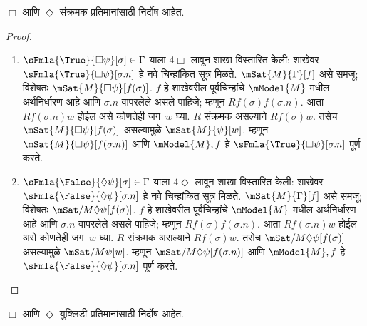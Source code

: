 \begin{prop}
  \label{nml:tab:msn:prop:soundness-4}
  $\Box$
   आणि
  $\Diamond$
  संक्रमक प्रतिमानांसाठी
  निर्दोष आहेत.
\end{prop}
\begin{proof}
\begin{enumerate}
\item $\sFmla{\True}{\Box \psi}[\sigma] \in \Gamma$
  याला 4$\Box$ लावून शाखा विस्तारित केली:
  शाखेवर
    $\sFmla{\True}{\Box\psi}[\sigma.n]$ हे नवे
    चिन्हांकित सूत्र मिळते. $\mSat{M}{\Gamma}[f]$
    असे समजू; विशेषतः
    $\mSat{M}{\Box \psi}[f(\sigma)]$.
    $f$ हे शाखेवरील पूर्वचिन्हांचे
    $\mModel{M}$ मधील अर्थनिर्धारण आहे
    आणि $\sigma.n$ वापरलेले असले पाहिजे;
    म्हणून $Rf(\sigma)f(\sigma.n)$.
    आता $Rf(\sigma.n)w$ होईल असे कोणतेही
    जग~$w$ घ्या. $R$ संक्रमक असल्याने
    $Rf(\sigma)w$. तसेच
    $\mSat{M}{\Box \psi}[f(\sigma)]$
    असल्यामुळे $\mSat{M}{\psi}[w]$.
    म्हणून $\mSat{M}{\Box \psi}[f(\sigma.n)]$
    आणि $\mModel{M}, f$ हे
    $\sFmla{\True}{\Box \psi}[\sigma.n]$ पूर्ण करते.
\item $\sFmla{\False}{\Diamond \psi}[\sigma] \in \Gamma$
  याला 4$\Diamond$ लावून शाखा विस्तारित केली:
  शाखेवर
    $\sFmla{\False}{\Diamond\psi}[\sigma.n]$ हे नवे
    चिन्हांकित सूत्र मिळते. $\mSat{M}{\Gamma}[f]$
    असे समजू; विशेषतः
    $\mSat/{M}{\Diamond \psi}[f(\sigma)]$.
    $f$ हे शाखेवरील पूर्वचिन्हांचे
    $\mModel{M}$ मधील अर्थनिर्धारण आहे
    आणि $\sigma.n$ वापरलेले असले पाहिजे;
    म्हणून $Rf(\sigma)f(\sigma.n)$.
    आता $Rf(\sigma.n)w$ होईल असे कोणतेही
    जग~$w$ घ्या. $R$ संक्रमक असल्याने
    $Rf(\sigma)w$. तसेच
    $\mSat/{M}{\Diamond \psi}[f(\sigma)]$
    असल्यामुळे $\mSat/{M}{\psi}[w]$.
    म्हणून $\mSat/{M}{\Diamond \psi}[f(\sigma.n)]$
    आणि $\mModel{M}, f$ हे
    $\sFmla{\False}{\Diamond \psi}[\sigma.n]$ पूर्ण करते.
\end{enumerate}
\end{proof}
\begin{prop}
  \label{nml:tab:msn:prop:soundness-4r}
  $\Box$
   आणि
  $\Diamond$
  युक्लिडी प्रतिमानांसाठी
  निर्दोष आहेत.
\end{prop}
